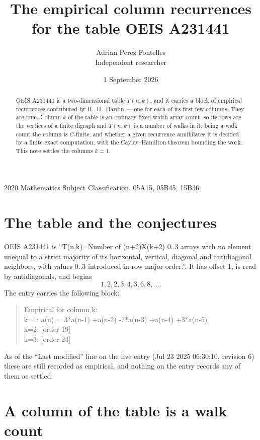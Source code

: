 \documentclass[11pt,a4paper]{article}
\title{The empirical column recurrences for the table OEIS A231441}
\author{Adrian Perez Fontelles\\ \small Independent researcher}
\date{1 September 2026}
\theoremstyle{plain}
\theoremstyle{definition}
\begin{document}
\maketitle

\begin{abstract}
OEIS A231441 is a two-dimensional table $T(n,k)$, and it carries a block of empirical
recurrences contributed by R.~H.~Hardin --- one for each of its first few columns. They are
true. Column $k$ of the table is an ordinary fixed-width array count, so its rows are the
vertices of a finite digraph and $T(n,k)$ is a number of walks in it; being a walk count the
column is $C$-finite, and whether a given recurrence annihilates it is decided by a finite
exact computation, with the Cayley--Hamilton theorem bounding the work. This note settles the columns $k=1$.
\end{abstract}

\noindent\small 2020 Mathematics Subject Classification. 05A15, 05B45, 15B36.\normalsize

\section{The table and the conjectures}

OEIS A231441 is ``T(n,k)=Number of (n+2)X(k+2) 0..3 arrays with no element unequal to a strict majority of its horizontal, vertical, diagonal and antidiagonal neighbors, with values 0..3 introduced in row major order.''. It has offset $1$, is
read by antidiagonals, and begins
\[
1, 2, 2, 3, 4, 3, 6, 8,\ \dots
\]
The entry carries the following block:
\begin{quote}\small
Empirical for column k:\\
k=1: a(n) = 3*a(n-1) +a(n-2) -7*a(n-3) +a(n-4) +3*a(n-5)\\
k=2: [order 19]\\
k=3: [order 24]\\
\end{quote}
As of the ``Last modified'' line on the live entry (Jul 23 2025 06:30:10, revision 6) these are still
recorded as empirical, and nothing on the entry records any of them as settled.

\section{A column of the table is a walk count}
\end{document}
